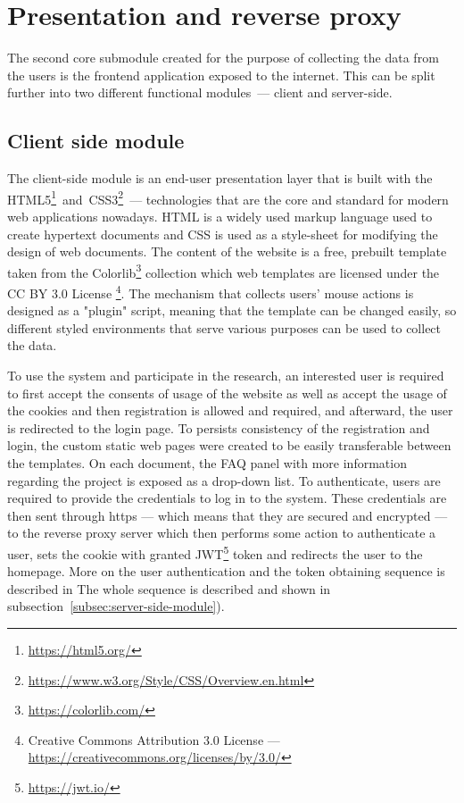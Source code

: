 \section{Presentation and reverse proxy}\label{sec:reverse-proxy}
The second core submodule created for the purpose of collecting the data from the users is the frontend application exposed to the internet.
This can be split further into two different functional modules~--- client and server-side.

\subsection{Client side module}\label{subsec:client-side-module}
The client-side module is an end-user presentation layer that is built with the HTML5\footnote{\url{https://html5.org/}}~and~CSS3\footnote{\url{https://www.w3.org/Style/CSS/Overview.en.html}}~--- technologies that are the core and standard for modern web applications nowadays.
HTML is a widely used markup language used to create hypertext documents and CSS is used as a style-sheet for modifying the design of web documents.
The content of the website is a free, prebuilt template taken from the Colorlib\footnote{\url{https://colorlib.com/}} collection which web templates are licensed under the CC BY 3.0 License \footnote{Creative Commons Attribution 3.0 License --- \url{https://creativecommons.org/licenses/by/3.0/}}.
The mechanism that collects users' mouse actions is designed as a "plugin" script, meaning that the template can be changed easily, so different styled environments that serve various purposes can be used to collect the data.

To use the system and participate in the research, an interested user is required to first accept the consents of usage of the website as well as accept the usage of the cookies and then registration is allowed and required, and afterward, the user is redirected to the login page.
To persists consistency of the registration and login, the custom static web pages were created to be easily transferable between the templates.
On each document, the FAQ panel with more information regarding the project is exposed as a drop-down list.
To authenticate, users are required to provide the credentials to log in to the system.
These credentials are then sent through https --- which means that they are secured and encrypted --- to the reverse proxy server which then performs some action to authenticate a user, sets the cookie with granted JWT\footnote{\url{https://jwt.io/}} token and redirects the user to the homepage.
More on the user authentication and the token obtaining sequence is described in
The whole sequence is described and shown in subsection~\ref{subsec:server-side-module}).


